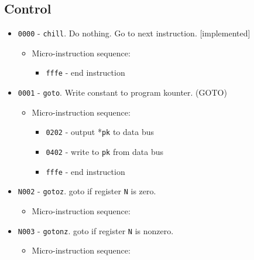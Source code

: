 \documentclass{article}
\def\pkptrout{\Verb|0202| - output *\Verb|pk| to data bus}
\def\datatopk{\Verb|0402| - write to \Verb|pk| from data bus}
\def\datatotmpa{\Verb|2402| - write to \Verb|tmpA| from data bus}
\def\tmpatopkifz{\Verb|0602| - write to \Verb|pk| from \Verb|tmpA| if data bus is zero; increment otherwise}
\def\tmpatopkifnz{\Verb|0702| - write to \Verb|pk| from \Verb|tmpA| if data bus is nonzero; increment otherwise}
\def\regtodata#1{\Verb|#1003| - output \Verb|r#1| to data bus}
\def\done{\Verb|fffe| - end instruction}
\begin{document}
\subsection{Control}
\begin{itemize}
    \item \Verb|0000| - \Verb|chill|. Do nothing. Go to next instruction. [implemented]
    \begin{itemize}
        \item Micro-instruction sequence:
        \begin{itemize}
            \item \done
        \end{itemize}
    \end{itemize}

    \item \Verb|0001| - \Verb|goto|. Write constant to program kounter. (GOTO)
    \begin{itemize}
        \item Micro-instruction sequence:
        \begin{itemize}
            \item \pkptrout
            \item \datatopk
            \item \done
        \end{itemize}
    \end{itemize}

    \item \Verb|N002| - \Verb|gotoz|. goto if register \Verb|N| is zero.
    \begin{itemize}
        \item Micro-instruction sequence:
    \end{itemize}

    \item \Verb|N003| - \Verb|gotonz|. goto if register \Verb|N| is nonzero.
    \begin{itemize}
        \item Micro-instruction sequence:
    \end{itemize}


\end{itemize}
\end{document}
